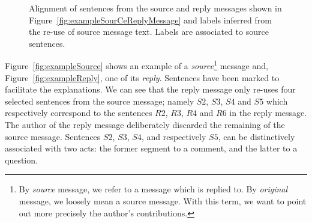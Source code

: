 \begin{figure}
\begin{minipage}{.3\textwidth}
\caption{Alignment of sentences from the source and reply messages shown in Figure~\ref{fig:exampleSourCeReplyMessage} and labels inferred from the re-use of source message text. Labels are associated to source sentences.}
\label{fig:exampleSegmentationLabels}
\end{minipage}

\end{figure}



Figure~\ref{fig:exampleSource} shows an example of a \textit{source}\footnote{By \textit{source} message, we refer to a message which is replied to. By \textit{original} message, we loosely mean a source message. With this term, we want to point out more precisely the author's contributions.} message and, Figure~\ref{fig:exampleReply}, one of its \textit{reply}.
Sentences have been marked to facilitate the explanations.
We can see that the reply message only re-uses four selected sentences from the source message; namely $S2$, $S3$, $S4$ and $S5$ which respectively correspond to the sentences  $R2$, $R3$, $R4$ and $R6$ in the reply message.
The author of the reply message deliberately discarded the remaining of the source message.
%
Sentences $S2$, $S3$, $S4$,  and respectively $S5$, can be distinctively associated with two acts: the former segment to a comment, and the latter to a question.


